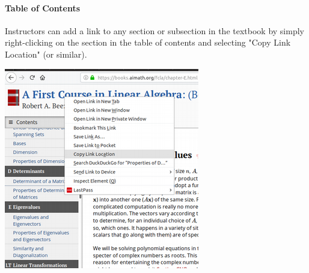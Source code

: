 \documentclass[10pt,]{article}
\begin{document}
\paragraph[{Table of Contents}]{Table of Contents}\hypertarget{paragraphs-1}{}
\begin{sidebyside}{2}{0}{0}{0}
\begin{sbspanel}{0.65}
\hypertarget{p-7}{}%
Instructors can add a link to any section or subsection in the textbook by simply right-clicking on the section in the table of contents and selecting "Copy Link Location" (or similar).%
\end{sbspanel}
\begin{sbspanel}{0.35}
\includegraphics[width=1\linewidth]{images/section-URL.png}
\end{sbspanel}
\begin{sbscaption}{0.65}
\end{sbscaption}
\begin{sbscaption}{0.35}
\end{sbscaption}
\end{sidebyside}
\typeout{************************************************}
\typeout{************************************************}
\end{document}
